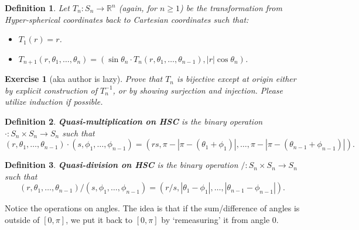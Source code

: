 \documentclass{article}
\theoremstyle{plain}
\newtheorem{definition}{Definition}[section]
\newtheorem{exercise}{Exercise}[section]
\begin{document}
\begin{definition}\label{hsc}
Let $T_n: S_n \rightarrow \mathbb{R}^n$ (again, for $n \ge 1$) be the transformation from Hyper-spherical coordinates back to Cartesian coordinates such that:
\begin{itemize}
	\item $T_1(r) = r$.
	\item $T_{n+1}(r, \theta_1, \ldots, \theta_n) = ( \sin{\theta_n} \cdot T_n(r, \theta_1, \ldots, \theta_{n-1}), |r| \cos{\theta_n})$.
\end{itemize}
\end{definition}
\begin{exercise}[aka author is lazy]
Prove that $T_n$ is bijective \textit{except at origin} either by explicit construction of $T_n^{-1}$, or by showing surjection and injection. Please utilize induction if possible.
\end{exercise}
\begin{definition}
\textbf{Quasi-multiplication on HSC} is the binary operation $\cdot: S_n \times S_n \rightarrow S_n$ such that $$(r, \theta_1, \ldots, \theta_{n-1}) \cdot (s, \phi_1, \ldots, \phi_{n-1}) = (rs, \pi - |\pi - (\theta_1 + \phi_1)|, \ldots, \pi - |\pi - (\theta_{n-1} + \phi_{n-1})|).$$
\end{definition}
\begin{definition}
\textbf{Quasi-division on HSC} is the binary operation $/: S_n \times S_n \rightarrow S_n$ such that $$(r, \theta_1, \ldots, \theta_{n-1}) / (s, \phi_1, \ldots, \phi_{n-1}) = (r/s, |\theta_1 - \phi_1|, \ldots, |\theta_{n-1} - \phi_{n-1}|).$$
\end{definition}
Notice the operations on angles. The idea is that if the sum/difference of angles is outside of $[0,\pi]$, we put it back to $[0,\pi]$ by `remeasuring' it from angle $0$.
\end{document}
